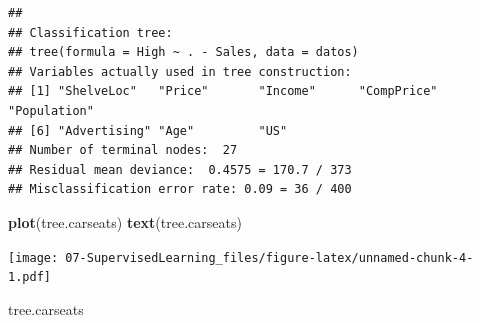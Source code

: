 \documentclass[]{book}
\newenvironment{Shaded}{\begin{snugshade}}{\end{snugshade}}
\newcommand{\KeywordTok}[1]{\textcolor[rgb]{0.13,0.29,0.53}{\textbf{#1}}}
\newcommand{\NormalTok}[1]{#1}
\begin{document}
\begin{verbatim}
## 
## Classification tree:
## tree(formula = High ~ . - Sales, data = datos)
## Variables actually used in tree construction:
## [1] "ShelveLoc"   "Price"       "Income"      "CompPrice"   "Population" 
## [6] "Advertising" "Age"         "US"         
## Number of terminal nodes:  27 
## Residual mean deviance:  0.4575 = 170.7 / 373 
## Misclassification error rate: 0.09 = 36 / 400
\end{verbatim}

\begin{Shaded}
\begin{Highlighting}[]
\KeywordTok{plot}\NormalTok{(tree.carseats)}
\KeywordTok{text}\NormalTok{(tree.carseats)}
\end{Highlighting}
\end{Shaded}

\texttt{[image: 07-SupervisedLearning\_files/figure-latex/unnamed-chunk-4-1.pdf]}

\begin{Shaded}
\begin{Highlighting}[]
\NormalTok{tree.carseats}
\end{Highlighting}
\end{Shaded}
\end{document}

